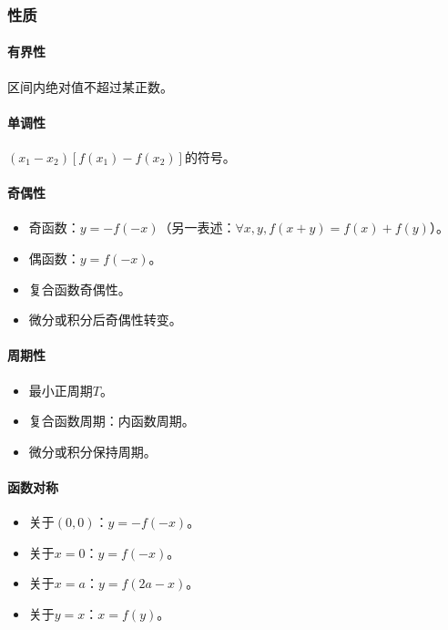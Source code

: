 \documentclass[
12pt, %
a4paper, 
oneside, %
headinclude,footinclude, %
]{scrartcl}
\begin{document}
\subsubsection[性质]{性质}
\paragraph{有界性}
区间内绝对值不超过某正数。
\paragraph{单调性}
$ (x_1 - x_2)[f(x_1) - f(x_2)] $的符号。
\paragraph{奇偶性}
\begin{itemize}
\item 奇函数：$ y = -f(-x) $（另一表述：$ \forall x,y, f(x + y) = f(x) + f(y) $）。
\item 偶函数：$ y = f(-x) $。
\item 复合函数奇偶性。
\item 微分或积分后奇偶性转变。
\end{itemize}
\paragraph{周期性}
\begin{itemize}
\item 最小正周期$ T $。
\item 复合函数周期：内函数周期。
\item 微分或积分保持周期。
\end{itemize}
\paragraph{函数对称}
\begin{itemize}
\item 关于$ (0, 0) $：$ y = -f(-x) $。
\item 关于$ x = 0 $：$ y = f(-x) $。
\item 关于$ x = a $：$ y = f(2a - x) $。
\item 关于$ y = x $：$ x = f(y) $。
\end{itemize}
\end{document}
